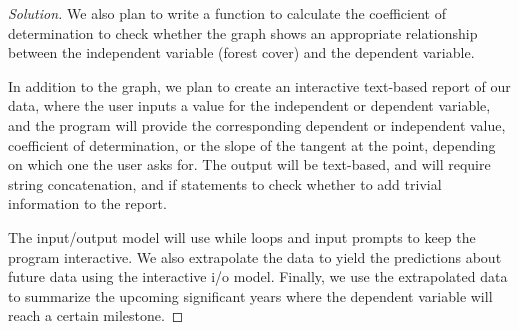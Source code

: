 \documentclass[12pt]{article}
\newenvironment{solution}
  {\renewcommand\qedsymbol{$\blacksquare$}
  \begin{proof}[Solution]}
  {\end{proof}}
\renewcommand\qedsymbol{$\blacksquare$}
\begin{document}
\begin{enumerate}
\begin{solution}
We also plan to write a function to calculate the coefficient of determination to check whether the graph shows an appropriate relationship between the independent variable (forest cover) and the dependent variable. 

In addition to the graph, we plan to create an interactive text-based report of our data, where the user  inputs a value for the independent or dependent variable, and the program will provide the corresponding dependent or independent value, coefficient of determination, or the slope of the tangent at the point, depending on which one the user asks for. The output will be text-based, and will require string concatenation, and if statements to check whether to add trivial information to the report. 

The input/output model will use while loops and input prompts to keep the program interactive. We also extrapolate the data to yield the predictions about future data using the interactive i/o model. Finally, we use the extrapolated data to summarize the upcoming significant years where the dependent variable will reach a certain milestone.


\end{solution}

\maketitle

\newpage

 \end{enumerate}
\end{document}
